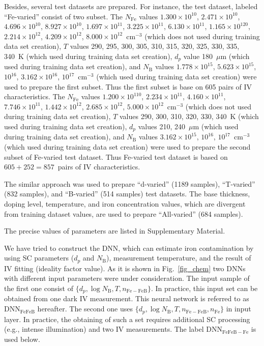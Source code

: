 \documentclass[num-refs]{wiley-article} %
\begin{document}
Besides, several test datasets are prepared.
For instance, the test dataset, labeled ``Fe-varied'' consist of two subset.
The $N_{\mathrm{Fe}}$ values 
$1.300\times10^{10}$, $2.471\times10^{10}$, $4.696\times10^{10}$, 
$8.927\times10^{10}$, $1.697\times10^{11}$, $3.225\times10^{11}$, 
$6.130\times10^{11}$, $1.165\times10^{120}$, $2.214\times10^{12}$, 
$4.209\times10^{12}$, $8.000\times10^{12}$~cm$^{-3}$
(which does not used during training data set creation),
$T$ values 290, 295, 300, 305, 310, 315, 320, 325, 330, 335, 340~K
(which used during training data set creation),
$d_p$ value 180~$\mu$m (which used during training data set creation),
and $N_\mathrm{B}$ values 
$1.778\times10^{15}$, $5.623\times10^{15}$, $10^{16}$, 
$3.162\times10^{16}$, $10^{17}$~cm$^{-3}$
(which used during training data set creation)
were used to prepare the first subset.
Thus the first subset is base on 605 pairs of IV characteristics.
The $N_{\mathrm{Fe}}$ values 
$1.200\times10^{110}$, $2.234\times10^{11}$, $4.160\times10^{11}$, 
$7.746\times10^{11}$, $1.442\times10^{12}$, $2.685\times10^{12}$, 
$5.000\times10^{12}$~cm$^{-3}$
(which does not used during training data set creation),
$T$ values 290, 300, 310, 320, 330, 340~K
(which used during training data set creation),
$d_p$ values 210, 240~$\mu$m (which used during training data set creation),
and $N_\mathrm{B}$ values 
$3.162\times10^{15}$, $10^{16}$, 
$10^{17}$~cm$^{-3}$
(which used during training data set creation)
were used to prepare the second subset of Fe-varied test dataset.
Thus Fe-varied test dataset is based on $605+252=857$~pairs of IV characteristics.

The similar approach was used to prepare ``d-varied'' (1189 samples), ``T-varied'' (832 samples), and ``B-varied'' (514 samples) test datasets.
The base thickness, doping level, temperature, and iron concentration values, which are divergent from training dataset values, are used to prepare ``All-varied'' (684 samples).

The precise values of parameters are listed in Supplementary Material.

We have tried to construct the DNN, which can estimate iron contamination by using
SC parameters ($d_p$ and $N_\mathrm{B}$),  measurement temperature, and the result of IV fitting (ideality factor value).
As it is shown in Fig.~\ref{fig_chem} two DNNs with different input parameters were under consideration.
The input sample of the first one consist of $\{d_p,\log N_\mathrm{B},T,n_\mathrm{Fe-FeB}\}$.
In practice, this input set can be obtained from one dark IV measurement.
This neural network is referred to as DNN$_\mathrm{FeFeB}$ hereafter.
The second one uses  $\{d_p,\log N_\mathrm{B},T,n_\mathrm{Fe-FeB},n_\mathrm{Fe}\}$ in input layer.
In practice, the obtaining of such a set requires additional SC processing (e.g., intense illumination) and two IV measurements.
The label  DNN$_\mathrm{FeFeB-Fe}$ is used below.
\end{document}
